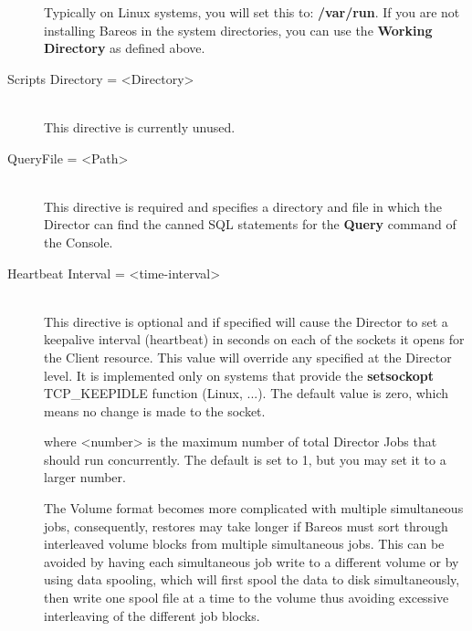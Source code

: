 \begin{description}
Typically on Linux systems, you will set this to:  {\bf /var/run}. If you are
not installing Bareos in the  system directories, you can use the {\bf Working
Directory} as  defined above.

\item [Scripts Directory = {\textless}Directory{\textgreater}] \hfill \\
This directive is currently unused.

\item [QueryFile = {\textless}Path{\textgreater}] \hfill \\
This directive is required and specifies a directory and file in which
the Director can find the canned SQL statements for the {\bf Query}
command of the Console.


\item [Heartbeat Interval = {\textless}time-interval{\textgreater}] \hfill \\
This directive is optional and if specified will cause the Director to
set a keepalive interval (heartbeat) in seconds on each of the sockets
it opens for the Client resource.  This value will override any
specified at the Director level.  It is implemented only on systems
that provide the {\bf setsockopt} TCP\_KEEPIDLE function (Linux, ...).
The default value is zero, which means no change is made to the socket.

\label{DirMaxConJobs}
where {\textless}number{\textgreater}  is the maximum number of total Director Jobs that
should run  concurrently. The default is set to 1, but you may set it to a
larger number.

The Volume format becomes more complicated with
multiple simultaneous jobs, consequently, restores may take longer if
Bareos must sort through interleaved volume blocks from  multiple simultaneous
jobs. This can be avoided by having each simultaneous job write to
a different volume or  by using data spooling, which will first spool the data
to disk simultaneously, then write one spool file at a time to the volume
thus avoiding excessive interleaving of the different job blocks.


\end{description}
